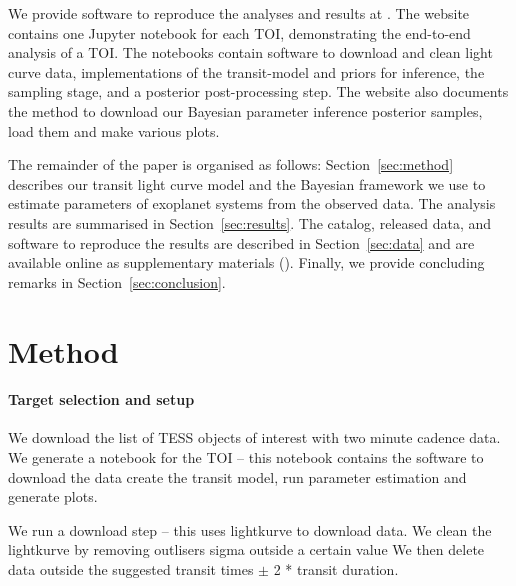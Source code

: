 \documentclass[floatfix,ApJL,twocolumn]{aastex631}
\begin{document}
We provide software to reproduce the analyses and results at \atlasUrl. 
The website contains one Jupyter notebook for each TOI, demonstrating the end-to-end analysis of a TOI. 
The notebooks contain software to download and clean light curve data, implementations of the transit-model and priors for inference, the \pymc sampling stage, and a posterior post-processing step.
The website also documents the method to download our Bayesian parameter inference posterior samples, load them and make various plots.  


The remainder of the paper is organised as follows: Section~\ref{sec:method} describes our transit light curve model and the Bayesian framework we use to estimate parameters of exoplanet systems from the observed data. 
The analysis results are summarised in Section~\ref{sec:results}.
The catalog, released data, and software to reproduce the results are described in Section~\ref{sec:data} and are available online as supplementary materials (\atlasUrl).
Finally, we provide concluding remarks in Section~\ref{sec:conclusion}.





\section{Method} \label{sec:model}

\paragraph{Target selection and setup }
We download the list of TESS objects of interest with two minute cadence data.
We generate a notebook for the TOI -- this notebook contains the software to download the data create the transit model, run parameter estimation and generate plots.

We run a download step -- this uses lightkurve to download data. 
We clean the lightkurve by removing outlisers sigma outside a certain value
We then delete data outside the suggested transit times $\pm$ 2 * transit duration. 
\end{document}
